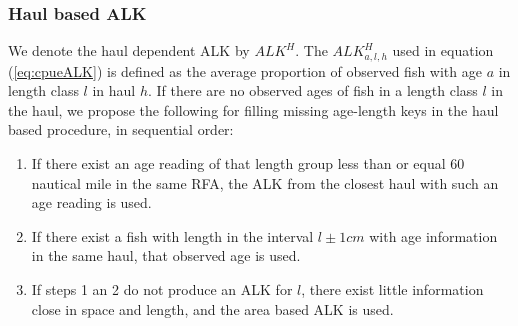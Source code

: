 \documentclass[a4paper 12pt]{article}
\numberwithin{equation}{section}
\newcommand{\ed}[1]{\textcolor{red}{#1}}
\newcommand{\olav}[1]{\textcolor{darkgreen}{#1}}
\begin{document}
\subsubsection{Haul based ALK}
\label{sec:haulestimator}
We denote the haul dependent ALK  by  $ALK^{H}$. The $ALK^{H}_{a,l,h}$  used in equation (\ref{eq:cpueALK}) is defined as the average proportion of observed fish with age $a$ in  length class $l$ in haul $h$. If there are no observed ages of fish in a length class $l$ in the haul, we propose the following for filling missing age-length keys in the  haul based procedure, in sequential order:
\begin{enumerate}
\item If there exist an age reading of that length group less than or equal 60 nautical mile in the same RFA, the ALK from the closest haul with such an age reading is used.
\item If there exist a fish with length in the interval $l\pm 1cm$ with age information in the same haul, that observed age is used.  
\item If steps 1 an 2 do not produce an ALK for $l$, there exist little information close in space and length, and the area based ALK is used. %
\end{enumerate}
\end{document}
